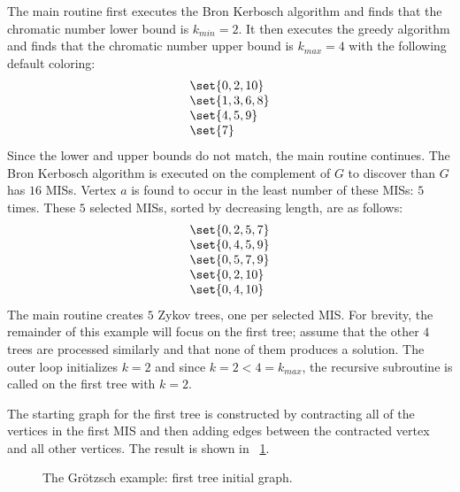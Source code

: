 The main routine first executes the Bron Kerbosch algorithm and finds that the chromatic number lower bound is
\(k_{min}=2\).  It then executes the greedy algorithm and finds that the chromatic number upper bound is
\(k_{max}=4\) with the following default coloring:
\[\begin{array}{l}
  \set{0, 2, 10} \\
  \set{1, 3, 6, 8} \\
  \set{4, 5, 9} \\
  \set{7}
\end{array}\]
Since the lower and upper bounds do not match, the main routine continues.  The Bron Kerbosch algorithm is executed
on the complement of \(G\) to discover than \(G\) has \(16\) MISs.  Vertex \(a\) is found to occur in the least
number of these MISs: \(5\) times.  These \(5\) selected MISs, sorted by decreasing length, are as follows:
\[\begin{array}{l}
  \set{0, 2, 5, 7} \\
  \set{0, 4, 5, 9} \\
  \set{0, 5, 7, 9} \\
  \set{0, 2, 10} \\
  \set{0, 4, 10}
\end{array}\]
The main routine creates \(5\) Zykov trees, one per selected MIS.  For brevity, the remainder of this example will
focus on the first tree; assume that the other \(4\) trees are processed similarly and that none of them produces a
solution.  The outer loop initializes \(k=2\) and since \(k=2<4=k_{max}\), the recursive subroutine is called on
the first tree with \(k=2\).

The starting graph for the first tree is constructed by contracting all of the vertices in the first MIS and then
adding edges between the contracted vertex and all other vertices.  The result is shown in
\figurename~\ref{fig:ex:ginit}.

\begin{figure}[H]
  \centering
  \caption{The Gr\"otzsch example: first tree initial graph.}
  \label{fig:ex:ginit}
\end{figure}

